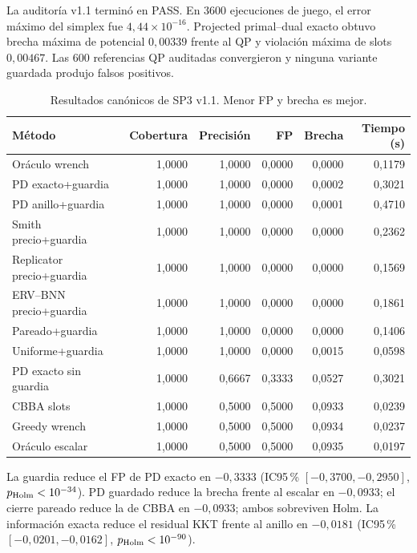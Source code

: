 La auditoría v1.1 terminó en PASS. En 3600 ejecuciones de juego, el error máximo del
simplex fue $4{,}44\times10^{-16}$. Projected primal--dual exacto obtuvo brecha máxima
de potencial $0{,}00339$ frente al QP y violación máxima de slots $0{,}00467$.
Las 600 referencias QP auditadas convergieron y ninguna variante guardada produjo
falsos positivos.

\begin{table}[H]
\centering
\caption{Resultados canónicos de SP3 v1.1. Menor FP y brecha es mejor.}
\label{tab:sp3-v11-main}
\scriptsize
\begin{tabular}{@{}lrrrrr@{}}
\toprule
Método & Cobertura & Precisión & FP & Brecha & Tiempo (s)\\
\midrule
Oráculo wrench & 1,0000 & 1,0000 & 0,0000 & 0,0000 & 0,1179\\
PD exacto+guardia & 1,0000 & 1,0000 & 0,0000 & 0,0002 & 0,3021\\
PD anillo+guardia & 1,0000 & 1,0000 & 0,0000 & 0,0001 & 0,4710\\
Smith precio+guardia & 1,0000 & 1,0000 & 0,0000 & 0,0000 & 0,2362\\
Replicator precio+guardia & 1,0000 & 1,0000 & 0,0000 & 0,0000 & 0,1569\\
ERV--BNN precio+guardia & 1,0000 & 1,0000 & 0,0000 & 0,0000 & 0,1861\\
Pareado+guardia & 1,0000 & 1,0000 & 0,0000 & 0,0000 & 0,1406\\
Uniforme+guardia & 1,0000 & 1,0000 & 0,0000 & 0,0015 & 0,0598\\
PD exacto sin guardia & 1,0000 & 0,6667 & 0,3333 & 0,0527 & 0,3021\\
CBBA slots & 1,0000 & 0,5000 & 0,5000 & 0,0933 & 0,0239\\
Greedy wrench & 1,0000 & 0,5000 & 0,5000 & 0,0934 & 0,0237\\
Oráculo escalar & 1,0000 & 0,5000 & 0,5000 & 0,0935 & 0,0197\\
\bottomrule
\end{tabular}
\end{table}

La guardia reduce el FP de PD exacto en $-0{,}3333$
(IC95\,\% $[-0{,}3700,-0{,}2950]$, $p_{\rm Holm}<10^{-34}$). PD
guardado reduce la brecha frente al escalar en $-0{,}0933$; el cierre pareado reduce
la de CBBA en $-0{,}0933$; ambos sobreviven Holm. La información exacta reduce el
residual KKT frente al anillo en $-0{,}0181$
(IC95\,\% $[-0{,}0201,-0{,}0162]$, $p_{\rm Holm}<10^{-90}$).

